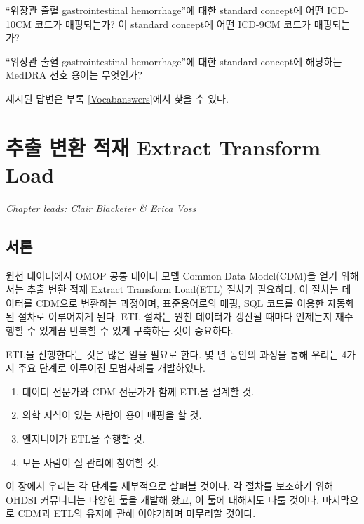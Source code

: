 \documentclass[10.5pt]{book}
\providecommand{\tightlist}{%
  \setlength{\itemsep}{0pt}\setlength{\parskip}{0pt}}
\theoremstyle{definition}
\theoremstyle{definition}
\theoremstyle{definition}
\theoremstyle{remark}
\let\BeginKnitrBlock\begin \let\EndKnitrBlock\end
\begin{document}
\BeginKnitrBlock{exercise}
\protect\hypertarget{exr:exerciseVocab2}{}{\label{exr:exerciseVocab2}
}``위장관 출혈 gastrointestinal hemorrhage''에 대한 standard concept에
어떤 ICD-10CM 코드가 매핑되는가? 이 standard concept에 어떤 ICD-9CM
코드가 매핑되는가?
\EndKnitrBlock{exercise}

\BeginKnitrBlock{exercise}
\protect\hypertarget{exr:exerciseVocab3}{}{\label{exr:exerciseVocab3}
}``위장관 출혈 gastrointestinal hemorrhage''에 대한 standard concept에
해당하는 MedDRA 선호 용어는 무엇인가?
\EndKnitrBlock{exercise}

제시된 답변은 부록 \ref{Vocabanswers}에서 찾을 수 있다.

\chapter{추출 변환 적재 Extract Transform
Load}\label{ExtractTransformLoad}

\emph{Chapter leads: Clair Blacketer \& Erica Voss}

\section{서론}

원천 데이터에서 OMOP 공통 데이터 모델 Common Data Model(CDM)을 얻기
위해서는 추출 변환 적재 Extract Transform Load(ETL) 절차가 필요하다. 이
절차는 데이터를 CDM으로 변환하는 과정이며, 표준용어로의 매핑, SQL 코드를
이용한 자동화된 절차로 이루어지게 된다. ETL 절차는 원천 데이터가 갱신될
때마다 언제든지 재수행할 수 있게끔 반복할 수 있게 구축하는 것이
중요하다. 
 

ETL을 진행한다는 것은 많은 일을 필요로 한다. 몇 년 동안의 과정을 통해
우리는 4가지 주요 단계로 이루어진 모범사례를 개발하였다.

\begin{enumerate}
\def\labelenumi{\arabic{enumi}.}
\tightlist
\item
  데이터 전문가와 CDM 전문가가 함께 ETL을 설계할 것.
\item
  의학 지식이 있는 사람이 용어 매핑을 할 것.
\item
  엔지니어가 ETL을 수행할 것.
\item
  모든 사람이 질 관리에 참여할 것.
\end{enumerate}

이 장에서 우리는 각 단계를 세부적으로 살펴볼 것이다. 각 절차를 보조하기
위해 OHDSI 커뮤니티는 다양한 툴을 개발해 왔고, 이 툴에 대해서도 다룰
것이다. 마지막으로 CDM과 ETL의 유지에 관해 이야기하며 마무리할 것이다.
\end{document}
